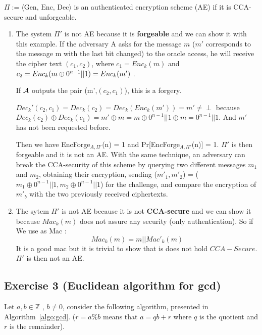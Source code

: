 \begin{solution}
$\Pi := \langle \text{Gen, Enc, Dec} \rangle$ is an authenticated encryption scheme (AE) if it is CCA-secure and unforgeable.
\begin{enumerate}
    \item The system $\Pi'$ is not AE because it is \textbf{forgeable} and we can show it with this example. If the adversary A asks for the message $m$ ($m'$ corresponds to the message m with the last bit changed) to the oracle access, he will receive the cipher text $(c_1, c_2)$, where $c_1 = Enc_k(m)$ and $c_2 = Enc_k(m\oplus 0^{n-1}||1) = Enc_k(m')$ . 
    
    If $\mathcal{A}$ outputs the pair (m',$(c_2, c_1)$), this is a forgery. 
    
    $Dec_k'(c_2,c_1) = Dec_k(c_2) = Dec_k(Enc_k(m')) = m' \neq \perp $ because $Dec_k(c_2) \oplus Dec_k(c_1) = m' \oplus m = m \oplus 0^{n-1}||1 \oplus m = 0^{n-1}||1 $. And $m'$ has not been requested before.
    
    Then we have EncForge$_{A, \Pi'}$(n) = 1  and Pr[EncForge$_{A, \Pi'}$(n)] = 1. $\Pi'$ is then forgeable and it is not an AE. 
    \newline
    With the same technique, an adversary can break the CCA-security of this scheme by querying two different messages $m_1$ and $m_2$, obtaining their encryption, sending \newline
    ($m'_1,m'_2$) = ($m_1 \oplus 0^{n-1}||1, m_2 \oplus 0^{n-1}||1$) for the challenge, and compare the encryption of $m'_b$ with the two previously received ciphertexts.
    \item The sytem $\Pi'$ is not AE because it is not \textbf{CCA-secure} and we can show it because $Mac_k(m)$ does not assure any security (only authentication). So if We use as Mac : 
    $$ Mac_k(m) = m||Mac'_k(m) $$
    It is a good mac but it is trivial to show that is does not hold $CCA-Secure$. $\Pi'$ is then not an AE.
\end{enumerate}
\end{solution}

\subsection{Exercise 3 (Euclidean algorithm for gcd)}
Let $a,b \in \mathbb{Z}$ , $b \neq 0$, consider the following algorithm, presented in Algorithm~\ref{algo:gcd}. ($r=a \% b$ means that $a=qb+r$ where $q$ is the quotient and $r$ is the remainder).

